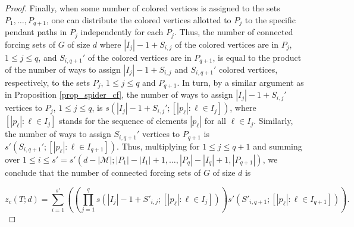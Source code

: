 \documentclass[11pt]{article}
\theoremstyle{definition}
\newcommand{\1}{\vspace{0.1cm}}
\newcommand{\2}{\vspace{0.2cm}}
\newcommand{\3}{\vspace{0.3cm}}
\begin{document}
\begin{proof}
Finally, when some number of colored vertices is assigned to the sets $P_1,\ldots,P_{q+1}$, one can distribute the colored vertices allotted to $P_j$ to the specific pendant paths in $P_j$ independently for each $P_j$. Thus, the number of connected forcing sets of $G$ of size $d$ where $|I_j|-1+S_{i,j}$ of the colored vertices are in $P_j$, $1\leq j\leq q$, and $S_{i,q+1}'$ of the colored vertices are in $P_{q+1}$, is equal to the product of the number of ways to assign $|I_j|-1+S_{i,j}$ and $S_{i,q+1}'$ colored vertices, respectively, to the sets $P_j$, $1\leq j\leq q$ and $P_{q+1}$. In turn, by a similar argument as in Proposition \ref{prop_spider_cf}, the number of ways to assign $|I_j|-1+S_{i,j}'$ vertices to $P_j$, $1\leq j\leq q$, is $s(|I_j|-1+S_{i,j}';[|p_\ell|:\ell\in I_j])$, where $[|p_\ell|:\ell\in I_j]$ stands for the sequence of elements $|p_\ell|$ for all $\ell\in I_j$. Similarly, the number of ways to assign $S_{i,q+1}'$ vertices to $P_{q+1}$ is $s'(S_{i,q+1}';[|p_\ell|:\ell\in I_{q+1}])$. Thus, multiplying for $1\leq j\leq q+1$ and summing over $1\leq i\leq s'=s'(d-|\mathcal{M}|;|P_1|-|I_1|+1,\ldots,|P_q|-|I_q|+1,|P_{q+1}|)$, we conclude that the number of connected forcing sets of $G$ of size $d$ is

\begin{equation*}
z_c(T;d)=\sum_{i=1}^{s'}\left(\left(\prod_{j=1}^q s(|I_j|-1+S'_{i,j};[|p_\ell|:\ell\in I_j])\right)s'(S'_{i,q+1};[|p_\ell|:\ell\in I_{q+1}])\right).
\end{equation*}
\end{proof}
\end{document}
